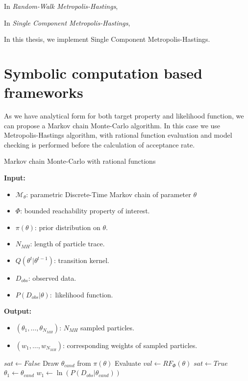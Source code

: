 In \textit{Random-Walk Metropolis-Hastings},


In \textit{Single Component Metropolis-Hastings},

In this thesis, we implement Single Component Metropolis-Hastings.

\section{Symbolic computation based frameworks}
\newpage
As we have analytical form for both target property and likelihood function, we can propose a Markov
chain Monte-Carlo algorithm. In this case we use Metropolis-Hastings algorithm, with rational
function evaluation and model checking is performed before the calculation of acceptance rate.
\begin{algorithm}[H]
      \caption{Markov chain Monte-Carlo with rational functions}
      \label{rf-mcmc-alg}
      \hspace*{\algorithmicindent} \textbf{Input:}
      \begin{itemize}
            \item $\mathcal{M}_\theta$: parametric Discrete-Time Markov chain of parameter $\theta$
            \item $\Phi$: bounded reachability property of interest.
            \item $\pi(\theta)$: prior distribution on $\theta$.
            \item $N_{MH}$: length of particle trace.
            \item $Q(\theta^t|\theta^{t-1})$: transition kernel.
            \item $D_{obs}$: observed data.
            \item $P(D_{obs}|\theta):$ likelihood function.
      \end{itemize}
      \hspace*{\algorithmicindent} \textbf{Output:}
      \begin{itemize}
            \item $(\theta_1,\ldots,\theta_{N_{MH}})$: $N_{MH}$ sampled particles.
            \item $(w_1,\ldots,w_{N_{MH}})$: corresponding weights of sampled particles.
      \end{itemize}
      \begin{algorithmic}[1]
            \State $sat \leftarrow False$
            \State Draw $\theta_{cand}$ from $\pi(\theta)$
            \State Evaluate $val \leftarrow RF_{\Phi}(\theta)$
            \State $sat \leftarrow True$
            \EndIf
            \EndWhile
            \State $\theta_1 \leftarrow  \theta_{cand}$
            \State $w_1 \leftarrow  \ln(P(D_{obs}|\theta_{cand}))$
      \end{algorithmic}
\end{algorithm}

